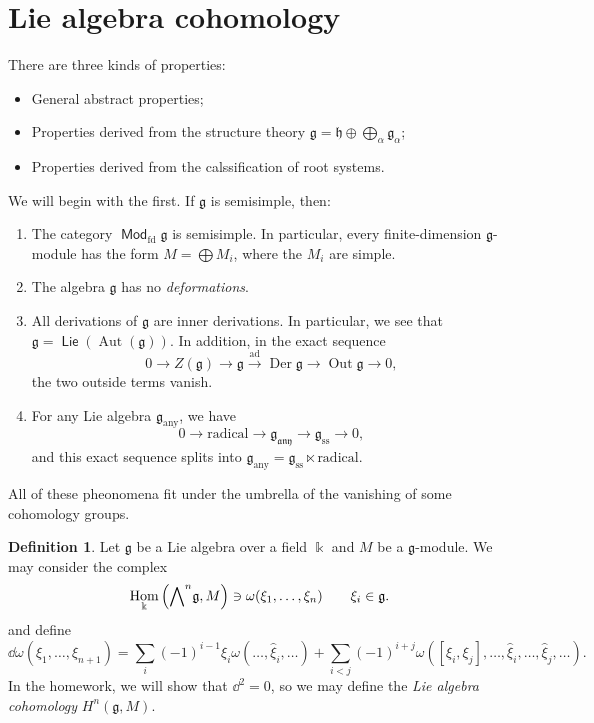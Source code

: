 \documentclass[leqno, openany]{memoir}
\theoremstyle{definition}
\newtheorem{defn}[thm]{Definition}
\theoremstyle{remark}
\theoremstyle{plain}
\theoremstyle{definition}
\theoremstyle{remark}
\renewcommand{\k}{\Bbbk}
\newcommand{\mf}[1]{\mathfrak{#1}}
\newcommand{\mr}[1]{\mathrm{#1}}
\newcommand{\wh}[1]{\widehat{#1}}
\DeclareMathOperator{\Hom}{Hom}
\DeclareMathOperator{\ad}{ad}
\DeclareMathOperator{\Aut}{Aut}
\DeclareMathOperator{\Lie}{\mathsf{Lie}}
\DeclareMathOperator{\Mod}{\mathsf{Mod}}
\begin{document}
\section{Lie algebra cohomology}%
\label{sec:semisimple_lie_algebras}

There are three kinds of properties:
\begin{itemize}
    \item General abstract properties;
    \item Properties derived from the structure theory $\mf{g} = \mf{h} \oplus \bigoplus_{\alpha} \mf{g}_{\alpha}$;
    \item Properties derived from the calssification of root systems.
\end{itemize}

We will begin with the first. If $\mf{g}$ is semisimple, then:
\begin{enumerate}
    \item The category $\Mod_{\mr{fd}} \mf{g}$ is semisimple. In particular, every finite-dimension $\mf{g}$-module has the form $M = \bigoplus M_i$, where the $M_i$ are simple.
    \item The algebra $\mf{g}$ has no \textit{deformations}. 
    \item All derivations of $\mf{g}$ are inner derivations. In particular, we see that $\mf{g} = \Lie(\Aut(\mf{g}))$. In addition, in the exact sequence
        \[ 0 \to Z(\mf{g}) \to \mf{g} \xrightarrow{\ad} \operatorname{Der} \mf{g} \to \operatorname{Out} \mf{g} \to 0, \]
        the two outside terms vanish.
    \item For any Lie algebra $\mf{g}_{\mr{any}}$, we have
        \[ 0 \to \text{radical} \to \mf{g}_{\mf{any}} \to \mf{g}_{\mr{ss}} \to 0, \]
        and this exact sequence splits into $\mf{g}_{\mr{any}} = \mf{g}_{\mr{ss}} \ltimes \text{radical}$.
\end{enumerate}
All of these pheonomena fit under the umbrella of the vanishing of some cohomology groups.

\begin{defn}
    Let $\mf{g}$ be a Lie algebra over a field $\k$ and $M$ be a $\mf{g}$-module. We may consider the complex
    \[ \Hom_{\k} \qty({\bigwedge}^n \mf{g}, M) \ni \omega(\xi_1, \ldots, \xi_n) \qquad \xi_i \in \mf{g}. \]
    and define
    \[ \dd{\omega}(\xi_1, \ldots, \xi_{n+1}) = \sum_i {(-1)}^{i-1} \xi_i \omega (\ldots, \wh{\xi}_i, \ldots) + \sum_{i < j} {(-1)}^{i+j} \omega ([\xi_i, \xi_j], \ldots, \wh{\xi}_i, \ldots, \wh{\xi}_j, \ldots). \]
    In the homework, we will show that $\dd^2 = 0$, so we may define the \textit{Lie algebra cohomology} $H^n(\mf{g}, M)$.
\end{defn}
\end{document}
